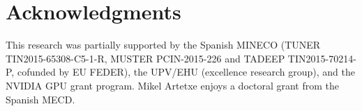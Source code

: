 \documentclass[11pt,a4paper]{article}
\begin{document}
\section*{Acknowledgments}

This research was partially supported by the Spanish MINECO (TUNER TIN2015-65308-C5-1-R, MUSTER PCIN-2015-226 and TADEEP TIN2015-70214-P, cofunded by EU FEDER), the UPV/EHU (excellence research group), and the NVIDIA GPU grant program. Mikel Artetxe enjoys a doctoral grant from the Spanish MECD.




\end{document}

